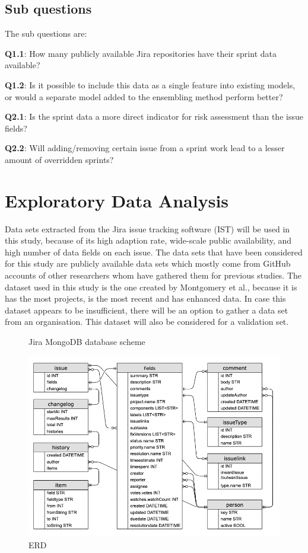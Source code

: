 \documentclass[sigconf]{acmart}
\begin{document}
\subsection{Sub questions}
The sub questions are:

\textbf{Q1.1}: How many publicly available Jira repositories have their sprint data available?

\textbf{Q1.2}: Is it possible to include this data as a single feature into existing models, or would a separate model added to the ensembling method perform better?

\textbf{Q2.1}: Is the sprint data a more direct indicator for risk assessment than the issue fields?  

\textbf{Q2.2}: Will adding/removing certain issue from a sprint work lead to a lesser amount of overridden sprints?


\section{Exploratory Data Analysis}
Data sets extracted from the Jira issue tracking software (IST) will be used in this study, because of its high adaption rate, wide-scale public availability, and high number of data fields on each issue.
The data sets that have been considered for this study are publicly available data sets which mostly come from GitHub accounts of other researchers whom have gathered them for previous studies.
The dataset used in this study is the one created by Montgomery et al.\cite{montgomery2022jira}, because it is has the most projects, is the most recent and has enhanced data.
In case this dataset appears to be insufficient, there will be an option to gather a data set from an organisation. This dataset will also be considered for a validation set.

\begin{figure}[h]
  \caption{Jira MongoDB database scheme}
  \centering
  \includegraphics[width=\linewidth]{overleaf/images/ERD-jira.png}
  \caption{ERD}
\end{figure}
\end{document}

